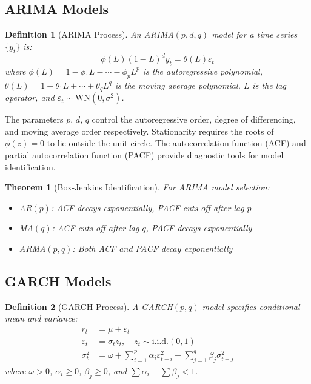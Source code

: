 \documentclass[a4paper, 11pt]{article}
\newtheorem{definition}{Definition}[section]
\newtheorem{theorem}{Theorem}[section]
\begin{document}
\subsection{ARIMA Models}

\begin{definition}[ARIMA Process]
An ARIMA$(p,d,q)$ model for a time series $\{y_t\}$ is:
\begin{equation}
\phi(L)(1-L)^d y_t = \theta(L)\varepsilon_t
\end{equation}
where $\phi(L) = 1 - \phi_1 L - \cdots - \phi_p L^p$ is the autoregressive polynomial,
$\theta(L) = 1 + \theta_1 L + \cdots + \theta_q L^q$ is the moving average polynomial,
$L$ is the lag operator, and $\varepsilon_t \sim \text{WN}(0, \sigma^2)$.
\end{definition}

The parameters $p$, $d$, $q$ control the autoregressive order, degree of differencing, and
moving average order respectively. Stationarity requires the roots of $\phi(z)=0$ to lie
outside the unit circle. The autocorrelation function (ACF) and partial autocorrelation
function (PACF) provide diagnostic tools for model identification.

\begin{theorem}[Box-Jenkins Identification]
For ARIMA model selection:
\begin{itemize}
\item AR$(p)$: ACF decays exponentially, PACF cuts off after lag $p$
\item MA$(q)$: ACF cuts off after lag $q$, PACF decays exponentially
\item ARMA$(p,q)$: Both ACF and PACF decay exponentially
\end{itemize}
\end{theorem}

\subsection{GARCH Models}

\begin{definition}[GARCH Process]
A GARCH$(p,q)$ model specifies conditional mean and variance:
\begin{align}
r_t &= \mu + \varepsilon_t \\
\varepsilon_t &= \sigma_t z_t, \quad z_t \sim \text{i.i.d.}(0,1) \\
\sigma_t^2 &= \omega + \sum_{i=1}^{p} \alpha_i \varepsilon_{t-i}^2 + \sum_{j=1}^{q} \beta_j \sigma_{t-j}^2
\end{align}
where $\omega > 0$, $\alpha_i \geq 0$, $\beta_j \geq 0$, and $\sum \alpha_i + \sum \beta_j < 1$.
\end{definition}
\end{document}
